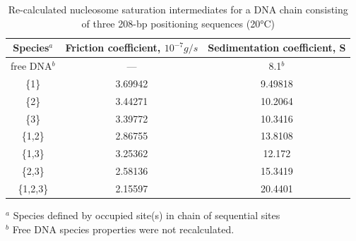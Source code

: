 \begin{table}[H]
\small
\caption{Re-calculated nucleosome saturation intermediates for a DNA chain consisting of three 208-bp positioning sequences (20°C)}
\begin{center}
\begin{tabular}{c|c|c}
Species$^a$ & Friction coefficient, $10^{-7}g/s$ & Sedimentation coefficient, S\\
\hline
free DNA$^b$	& —	& 8.1$^b$ \\
\{1\}		& 3.69942 & 9.49818 \\
\{2\}		& 3.44271 & 10.2064 \\
\{3\}		& 3.39772 & 10.3416 \\
\{1,2\}	& 2.86755 & 13.8108 \\
\{1,3\}	& 3.25362 & 12.172 \\
\{2,3\}	&  2.58136& 15.3419 \\
\{1,2,3\}	& 2.15597 & 20.4401 \\
\end{tabular}
\end{center}
$^a$ Species defined by occupied site(s) in chain of sequential sites\\
$^b$ Free DNA species properties were not recalculated.
\normalsize
\label{tablediff}
\end{table}
%
